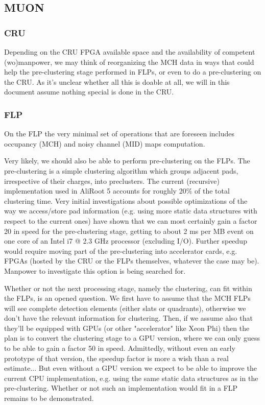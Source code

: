 \subsection{MUON}
\label{MUON:FLP}

\subsubsection{CRU}

Depending on the CRU FPGA available space and the availability of
competent (wo)manpower, we may think of reorganizing the MCH data in
ways that could help the pre-clustering stage performed in FLPs, or
even to do a pre-clustering on the CRU. As it's unclear whether all
this is doable at all, we will in this document assume nothing special
is done in the CRU.

\subsubsection{FLP}

On the FLP the very minimal set of operations that are foreseen
includes occupancy (MCH) and noisy channel (MID) maps computation.

Very likely, we should also be able to perform pre-clustering on the
FLPs. The pre-clustering is a simple clustering algorithm which groups
adjacent pads, irrespective of their charges, into preclusters. The
current (recursive) implementation used in AliRoot 5 accounts for
roughly 20\% of the total clustering time. Very initial investigations
about possible optimizations of the way we access/store pad
information (e.g. using more static data structures with respect to
the current ones) have shown that we can most certainly gain a factor
20 in speed for the pre-clustering stage, getting to about 2 ms per MB
\pbpb event on one core of an Intel i7 @ 2.3 GHz processor (excluding
I/O). Further speedup would require moving part of the pre-clustering
into accelerator cards, e.g. FPGAs (hosted by the CRU or the FLPs
themselves, whatever the case may be). Manpower to investigate this
option is being searched for.

Whether or not the next processing stage, namely the clustering, can
fit within the FLPs, is an opened question. We first have to assume
that the MCH FLPs will see complete detection elements (either slats
or quadrants), otherwise we don't have the relevant information for
clustering. Then, if we assume also that they'll be equipped with GPUs
(or other "accelerator" like Xeon Phi) then the plan is to convert the
clustering stage to a GPU version, where we can only guess to be able
to gain a factor 50 in speed. Admittedly, without even an early
prototype of that version, the speedup factor is more a wish than a
real estimate... But even without a GPU version we expect to be able
to improve the current CPU implementation, e.g. using the same static
data structures as in the pre-clustering. Whether or not such an
implementation would fit in a FLP remains to be demonstrated.

